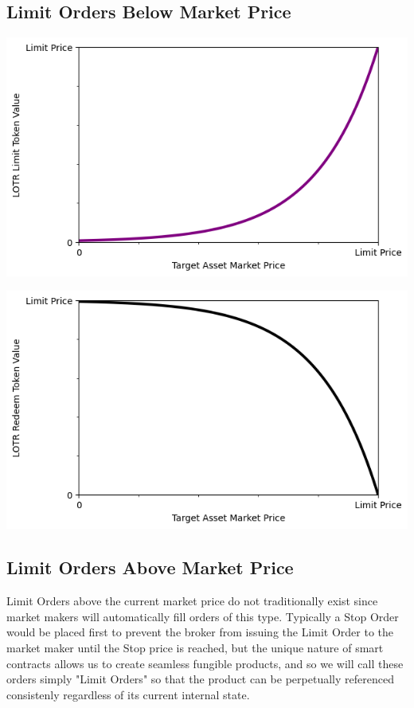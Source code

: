 \documentclass[12pt]{article}
\begin{document}
      \subsection*{Limit Orders Below Market Price}
      \begin{center}
      \includegraphics[scale=0.6]{graph_limit_below.png}
      \end{center}
      \begin{center}
      \includegraphics[scale=0.6]{graph_redeem_below.png}
      \end{center}

      \subsection*{Limit Orders Above Market Price}
      Limit Orders above the current market price do not traditionally exist since market makers will automatically fill orders of this type. Typically a Stop Order would be placed first to prevent the broker from issuing the Limit Order to the market maker until the Stop price is reached, but the unique nature of smart contracts allows us to create seamless fungible products, and so we will call these orders simply "Limit Orders" so that the product can be perpetually referenced consistenly regardless of its current internal state.
\end{document}
